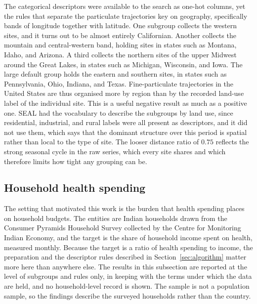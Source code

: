 The categorical descriptors were available to the search as one-hot columns, yet the rules that separate the particulate trajectories key on geography, specifically bands of longitude together with latitude. One subgroup collects the western sites, and it turns out to be almost entirely Californian. Another collects the mountain and central-western band, holding sites in states such as Montana, Idaho, and Arizona. A third collects the northern sites of the upper Midwest around the Great Lakes, in states such as Michigan, Wisconsin, and Iowa. The large default group holds the eastern and southern sites, in states such as Pennsylvania, Ohio, Indiana, and Texas. Fine-particulate trajectories in the United States are thus organised more by region than by the recorded land-use label of the individual site. This is a useful negative result as much as a positive one. SEAL had the vocabulary to describe the subgroups by land use, since residential, industrial, and rural labels were all present as descriptors, and it did not use them, which says that the dominant structure over this period is spatial rather than local to the type of site. The looser distance ratio of $0.75$ reflects the strong seasonal cycle in the raw series, which every site shares and which therefore limits how tight any grouping can be.

\subsection{Household health spending}
\label{sec:cmie}

The setting that motivated this work is the burden that health spending places on household budgets. The entities are Indian households drawn from the Consumer Pyramids Household Survey collected by the Centre for Monitoring Indian Economy, and the target is the share of household income spent on health, measured monthly. Because the target is a ratio of health spending to income, the preparation and the descriptor rules described in Section~\ref{sec:algorithm} matter more here than anywhere else. The results in this subsection are reported at the level of subgroups and rules only, in keeping with the terms under which the data are held, and no household-level record is shown. The sample is not a population sample, so the findings describe the surveyed households rather than the country.

